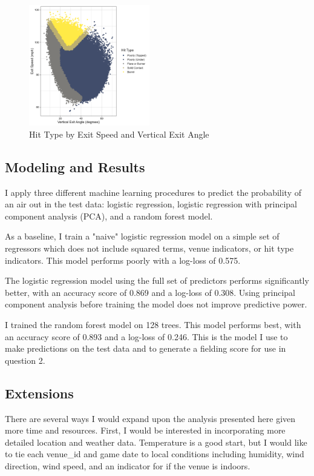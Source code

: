 \begin{figure}[htb]
  \includegraphics[width = 0.47\textwidth]{../../output/figs/barreled.png}
  \caption{Hit Type by Exit Speed and Vertical Exit Angle}
  \label{fig:barreled}
\end{figure}

\subsection{Modeling and Results}
\label{subsec:model}

I apply three different machine learning procedures to predict the probability of an air out in the test data: logistic regression, logistic regression with principal component analysis (PCA), and a random forest model.

As a baseline, I train a "naive" logistic regression model on a simple set of regressors which does not include squared terms, venue indicators, or hit type indicators. This model performs poorly with a log-loss of 0.575.

The logistic regression model using the full set of predictors performs significantly better, with an accuracy score of 0.869 and a log-loss of 0.308. Using principal component analysis before training the model does not improve predictive power.

I trained the random forest model on 128 trees. This model performs best, with an accuracy score of 0.893 and a log-loss of 0.246. This is the model I use to make predictions on the test data and to generate a fielding score for use in question 2.

\subsection{Extensions}
\label{subsec:results}

There are several ways I would expand upon the analysis presented here given more time and resources. First, I would be interested in incorporating more detailed location and weather data. Temperature is a good start, but I would like to tie each venue\_id and game date to local conditions including humidity, wind direction, wind speed, and an indicator for if the venue is indoors.

